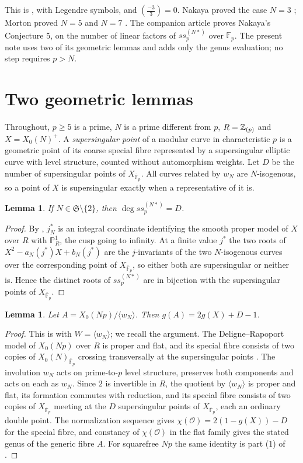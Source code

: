 \documentclass[11pt,a4paper]{article}
\newtheorem{lemma}[theorem]{Lemma}
\theoremstyle{remark}\newtheorem{remark}[theorem]{Remark}
\numberwithin{equation}{section}
\newcommand{\Fp}{\mathbb F_p}
\newcommand{\kk}{\overline{\mathbb F}_p}
\newcommand{\leg}[2]{\left(\frac{#1}{#2}\right)}
\begin{document}
This is \cite[Conjecture 6]{Nakaya}, with Legendre symbols, and $\leg{-3}{3}=0$. Nakaya proved the case $N=3$ \cite{Nakaya}; Morton proved $N=5$ \cite[Section 7]{Morton5b} and $N=7$ \cite[Section 3]{MortonFricke}. The companion article \cite{Companion} proves Nakaya's Conjecture 5, on the number of linear factors of $ss_p^{(N*)}$ over $\Fp$. The present note uses two of its geometric lemmas and adds only the genus evaluation; no step requires $p>N$.

\section{Two geometric lemmas}
Throughout, $p\geq5$ is a prime, $N$ is a prime different from $p$, $R=\mathbb Z_{(p)}$ and $X=X_0(N)^+$. A \emph{supersingular point} of a modular curve in characteristic $p$ is a geometric point of its coarse special fibre represented by a supersingular elliptic curve with level structure, counted without automorphism weights. Let $D$ be the number of supersingular points of $X_{\kk}$. All curves related by $w_N$ are $N$-isogenous, so a point of $X$ is supersingular exactly when a representative of it is.

\begin{lemma}\label{lem:coordinate}
If $N\in\mathfrak S\setminus\{2\}$, then $\deg ss_p^{(N*)}=D$.
\end{lemma}
\begin{proof}
By \cite[Proposition 5.1]{Companion}, $j_N^*$ is an integral coordinate identifying the smooth proper model of $X$ over $R$ with $\mathbb P^1_R$, the cusp going to infinity. At a finite value $j^*$ the two roots of $X^2-a_N(j^*)X+b_N(j^*)$ are the $j$-invariants of the two $N$-isogenous curves over the corresponding point of $X_{\kk}$, so either both are supersingular or neither is. Hence the distinct roots of $ss_p^{(N*)}$ are in bijection with the supersingular points of $X_{\kk}$.
\end{proof}

\begin{lemma}\label{lem:total}
Let $A=X_0(Np)/\langle w_N\rangle$. Then $g(A)=2g(X)+D-1$.
\end{lemma}
\begin{proof}
This is \cite[Lemma 3.1]{Companion} with $W=\langle w_N\rangle$; we recall the argument. The Deligne--Rapoport model of $X_0(Np)$ over $R$ is proper and flat, and its special fibre consists of two copies of $X_0(N)_{\kk}$ crossing transversally at the supersingular points \cite[VI, Theorem 6.9]{DR}. The involution $w_N$ acts on prime-to-$p$ level structure, preserves both components and acts on each as $w_N$. Since $2$ is invertible in $R$, the quotient by $\langle w_N\rangle$ is proper and flat, its formation commutes with reduction, and its special fibre consists of two copies of $X_{\kk}$ meeting at the $D$ supersingular points of $X_{\kk}$, each an ordinary double point. The normalization sequence gives $\chi(\mathcal O)=2(1-g(X))-D$ for the special fibre, and constancy of $\chi(\mathcal O)$ in the flat family gives the stated genus of the generic fibre $A$. For squarefree $Np$ the same identity is part (1) of \cite[Theorem 6.5]{BW}.
\end{proof}
\end{document}
